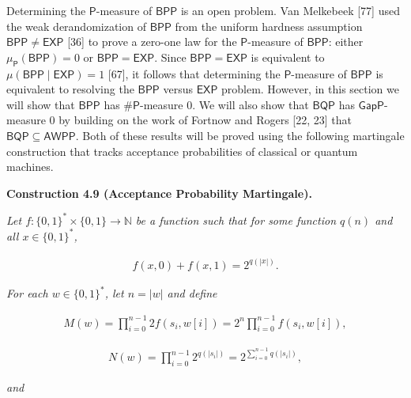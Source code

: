 Determining the $\mathsf{P}$-measure of $\mathsf{BPP}$ is an open problem. Van Melkebeek [77] used the weak derandomization of $\mathsf{BPP}$ from the uniform hardness assumption $\mathsf{BPP}\neq\mathsf{EXP}$ [36]
to prove a zero-one law for the $\mathsf{P}$-measure of $\mathsf{BPP}$:
either $\mu_{\mathsf{P}}(\mathsf{BPP})=0$ or $\mathsf{BPP}=\mathsf{EXP}$.
Since $\mathsf{BPP}=\mathsf{EXP}$ is equivalent to $\mu(\mathsf{BPP}\mid\mathsf{EXP})=1$ [67], it follows that determining the $\mathsf{P}$-measure of $\mathsf{BPP}$ is equivalent to resolving the $\mathsf{BPP}$ versus $\mathsf{EXP}$ problem. However, in this section we will show that $\mathsf{BPP}$ has ${\mathsf{\#}\mathsf{P}}$-measure 0. We will also show that $\mathsf{BQP}$ has $\mathsf{GapP}$-measure 0 by building on the work of Fortnow and Rogers [22, 23] that $\mathsf{BQP}\subseteq\mathsf{AWPP}$. Both of these results will be proved using the following martingale construction that tracks acceptance probabilities of classical or quantum machines.\par





\par\medskip\noindent\textbf{
\textbf{Construction 4.9}\textbf{ }(Acceptance Probability Martingale)\textbf{.}
}\par



\emph{Let $f:\{0,1\}^{*}\times\{0,1\}\to\mathbb{N}$ be a function such that for some function $q(n)$ and all $x\in\{0,1\}^{*}$,}\par


\[\begin{gathered}
f(x,0)+f(x,1)=2^{q(|x|)}.
\end{gathered}\]


\emph{For each $w\in\{0,1\}^{*}$, let $n=|w|$ and define}\par


\[\begin{gathered}
M(w)=\prod_{i=0}^{n-1}2f(s_{i},w[i])=2^{n}\prod_{i=0}^{n-1}f(s_{i},w[i]),
\end{gathered}\]


\[\begin{gathered}
N(w)=\prod_{i=0}^{n-1}2^{q(|s_{i}|)}=2^{\sum\limits_{i=0}^{n-1}q(|s_{i}|)},
\end{gathered}\]


\emph{and}\par


